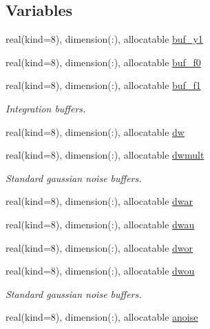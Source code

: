 \subsection*{Variables}
\begin{DoxyCompactItemize}
\item 
real(kind=8), dimension(\+:), allocatable \hyperlink{namespacerk2__mtv__integrator_aa33cc6702537576ce9327c8c1bacc0e0}{buf\+\_\+y1}
\item 
real(kind=8), dimension(\+:), allocatable \hyperlink{namespacerk2__mtv__integrator_a8a81a8ea6d873549ea3fab2c25ab8f56}{buf\+\_\+f0}
\item 
real(kind=8), dimension(\+:), allocatable \hyperlink{namespacerk2__mtv__integrator_a082b2bb51352639e114015017d7e8a8c}{buf\+\_\+f1}
\begin{DoxyCompactList}\small\item\em Integration buffers. \end{DoxyCompactList}\item 
real(kind=8), dimension(\+:), allocatable \hyperlink{namespacerk2__mtv__integrator_acfc8cafd615b189ed69fe547c21a523d}{dw}
\item 
real(kind=8), dimension(\+:), allocatable \hyperlink{namespacerk2__mtv__integrator_a00366eb109bd6df9f42317a1103b42d7}{dwmult}
\begin{DoxyCompactList}\small\item\em Standard gaussian noise buffers. \end{DoxyCompactList}\item 
real(kind=8), dimension(\+:), allocatable \hyperlink{namespacerk2__mtv__integrator_a943f1c40aae9be23e299c05b361c7ce5}{dwar}
\item 
real(kind=8), dimension(\+:), allocatable \hyperlink{namespacerk2__mtv__integrator_a00726f064d00787a9f02d960defbcf71}{dwau}
\item 
real(kind=8), dimension(\+:), allocatable \hyperlink{namespacerk2__mtv__integrator_a1d35c3699f7164073c6c616117541e1c}{dwor}
\item 
real(kind=8), dimension(\+:), allocatable \hyperlink{namespacerk2__mtv__integrator_af1862c97e660a0a557657dccbdc02fa8}{dwou}
\begin{DoxyCompactList}\small\item\em Standard gaussian noise buffers. \end{DoxyCompactList}\item 
real(kind=8), dimension(\+:), allocatable \hyperlink{namespacerk2__mtv__integrator_ad88a9e896280f9afe3d00bf76fe0aa20}{anoise}

\end{DoxyCompactItemize}
